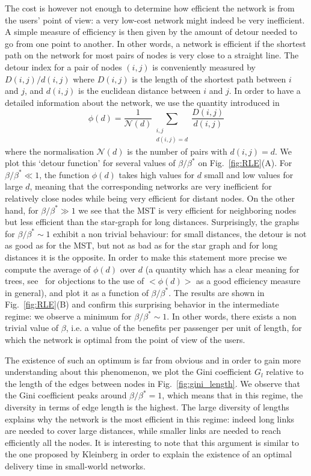 The cost is however not enough to determine how efficient the network is from the users' point of view: a very low-cost network might indeed be very inefficient. A simple measure of efficiency is then given by the amount of detour needed to go from one point to another. In other words, a network is efficient if the shortest path on the network for most pairs of nodes is very close to a straight line. The detour index for a pair of nodes $(i,j)$ is conveniently measured by $D(i,j)/d(i,j)$ where $D(i,j)$ is the length of the shortest path between $i$ and $j$, and $d(i,j)$ is the euclidean distance between $i$ and $j$. In order to have a detailed information about the network, we use the
quantity introduced in~\cite{Aldous:2010}
\begin{equation}
\phi(d) = \frac{1}{\mathcal{N}(d)} \sum_{\substack{i,j\\d(i,j) =d}} \frac{D(i,j)}{d(i,j)}
\end{equation}
where the normalisation $\mathcal{N}(d)$ is the number of pairs with $d(i,j)=d$.  We plot this `detour function' for several values of $\beta/\beta^*$ on Fig.~\ref{fig:RLE}(A). For $\beta/\beta^* \ll 1$, the function $\phi(d)$ takes high values for $d$ small and low values for large $d$, meaning that the corresponding networks are very inefficient for relatively close nodes while being very efficient for distant nodes. On the other hand, for $\beta/\beta^* \gg 1$ we see that the MST is very efficient for neighboring nodes but less efficient than the star-graph for long distances. Surprisingly, the graphs for $\beta/\beta^* \sim 1$ exhibit a non trivial behaviour: for small distances, the detour is not as good as for the MST, but not as bad as for the star graph and for long distances it is the opposite. In order to make this statement more precise we compute the average of $\phi(d)$ over $d$ (a quantity which has a clear meaning for trees, see~\cite{Aldous:2010} for objections to the use of $< \phi(d) >$ as a good efficiency measure in general), and plot it as a function of $\beta/\beta^*$. The results are shown in Fig.~\ref{fig:RLE}(B) and confirm this surprising behavior in the intermediate regime: we observe a minimum for $\beta/\beta^* \sim 1$. In other words, there exists a non trivial value of $\beta$, i.e. a value of the benefits per passenger per unit of length, for which the network is optimal from the point of view of the users. 

The existence of such an optimum is far from obvious and in order to gain more understanding about this phenomenon, we plot the Gini coefficient $G_l$ relative to the length of the edges between nodes in Fig.~\ref{fig:gini_length}. We observe that the Gini coefficient peaks around $\beta/\beta^* = 1$, which means that in this regime, the diversity in terms of edge length is the highest. The large diversity of lengths explains why the network is the most efficient in this regime: indeed long links are needed to cover large distances, while smaller links are needed to reach efficiently all the nodes. It is interesting to note that this argument is similar to the one proposed by Kleinberg \cite{Kleinberg:2000} in order to explain the existence of an optimal delivery time in small-world networks.

